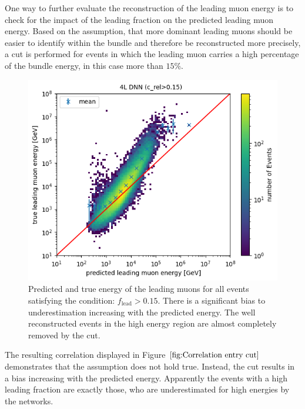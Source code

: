 \documentclass[
  tucolor,       %
  BCOR=12mm,     %
  parskip=half,  %
  open=any,      %
  cleardoublepage=plain,  %
]{tudothesis}
\begin{document}
One way to further evaluate the reconstruction of the leading muon energy is to check for the impact of the leading fraction on the predicted leading muon energy.
Based on the assumption, that more dominant leading muons should be easier to identify within the bundle and therefore be reconstructed more precisely, a cut is performed for events in which the leading muon carries a high percentage of the bundle energy, in this case more than $15\%$.
\begin{figure}
  \centering
  \includegraphics[scale=0.6]{Plots/Correlation leading muon energy smal dnn (c_rel>0.15)}
  \caption{Predicted and true energy of the leading muons for all events satisfying the condition: $f_{\mathrm{lead}}>0.15$. There is a significant bias to underestimation increasing with the predicted energy. The well reconstructed events in the high energy region are almost completely removed by the cut.}
  \label{fig:Correlation entry cut}
\end{figure}
The resulting correlation displayed in Figure $\ref{fig:Correlation entry cut}$ demonstrates that the assumption does not hold true.
Instead, the cut results in a bias increasing with the predicted energy.
Apparently the events with a high leading fraction are exactly those, who are underestimated for high energies by the networks.
\end{document}
